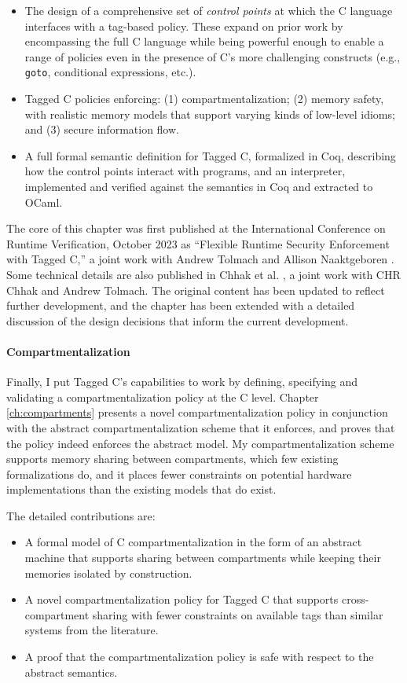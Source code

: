 \documentclass{report}
\begin{document}
\begin{itemize}
\item The design of a comprehensive set of {\em control points} at which the C language interfaces
  with a tag-based policy. These expand on prior work by encompassing the full C language
  while being powerful enough to enable a range of policies even in the presence of C's more
  challenging constructs (e.g., {\tt goto}, conditional expressions, etc.).
\item Tagged C policies enforcing: (1) compartmentalization;
  (2) memory safety, with realistic memory models that support varying kinds of low-level idioms;
  and (3) secure information flow.
\item A full formal semantic definition for Tagged C, formalized in Coq, describing how the
  control points interact with programs, and an interpreter, implemented and verified against
  the semantics in Coq and extracted to OCaml.
\end{itemize}

The core of this chapter was first published at the International Conference on Runtime Verification,
October 2023 as ``Flexible Runtime Security Enforcement with Tagged C,'' a joint work
with Andrew Tolmach and Allison Naaktgeboren \cite{Anderson23:TaggedC}. Some technical
details are also published in Chhak et al. \cite{}, a joint work with CHR Chhak and Andrew Tolmach.
The original content has been updated to reflect further development, and the chapter has been
extended with a detailed discussion of the design decisions that inform the current development.

\paragraph{Compartmentalization}

Finally, I put Tagged C's capabilities to work by defining, specifying and validating
a compartmentalization policy at the C level. Chapter \ref{ch:compartments} presents
a novel compartmentalization policy in conjunction with the abstract
compartmentalization scheme that it enforces, and proves that the policy indeed enforces the
abstract model. My compartmentalization scheme supports memory sharing between compartments,
which few existing formalizations do, and it places fewer constraints on potential hardware
implementations than the existing models that do exist.

The detailed contributions are:

\begin{itemize}
\item A formal model of C compartmentalization in the form of an abstract machine that
  supports sharing between compartments while keeping their memories isolated by construction.
\item A novel compartmentalization policy for Tagged C that supports cross-compartment
  sharing with fewer constraints on available tags than similar systems from the literature.
\item A proof that the compartmentalization policy is safe with respect to the abstract semantics.
\end{itemize}
\end{document}

